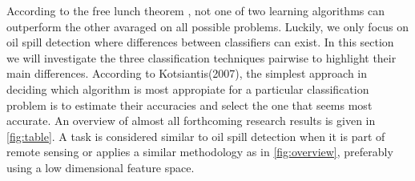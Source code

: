  
According to the free lunch theorem \cite{wolpert1995no}, not one of two learning algorithms can outperform the other avaraged on all possible problems. Luckily, we only focus on oil spill detection where differences between classifiers can exist. In this section we will investigate the three classification techniques pairwise to highlight their main differences. According to Kotsiantis(2007), the simplest approach in deciding which algorithm is most appropiate for a particular classification problem is to estimate their accuracies and select the one that seems most accurate\cite{kotsiantis2007supervised}. An overview of almost all forthcoming research results is given in \ref{fig:table}. A task is considered similar to oil spill detection when it is part of remote sensing or applies a similar methodology as in \ref{fig:overview}, preferably using a low dimensional feature space.